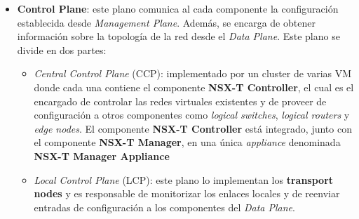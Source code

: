 \begin{itemize}
\begin{itemize}
        \item \textbf{Control Plane}: este plano comunica al cada componente la configuración establecida desde \textit{Management Plane}. Además, se encarga de obtener información sobre la topología de la red desde el \textit{Data Plane}. Este plano se divide en dos partes:
            \begin{itemize}
                \item \textit{Central Control Plane} (CCP): implementado por un cluster de varias VM donde cada una contiene el componente \textbf{NSX-T Controller}, el cual es el encargado de controlar las redes virtuales existentes y de proveer de configuración a otros componentes como \textit{logical switches}, \textit{logical routers} y \textit{edge nodes}. El componente \textbf{NSX-T Controller} está integrado, junto con el componente \textbf{NSX-T Manager}, en una única \textit{appliance} denominada \textbf{NSX-T Manager Appliance}
                \item \textit{Local Control Plane} (LCP): este plano lo implementan los \textbf{transport nodes} y es responsable de monitorizar los enlaces locales y de reenviar entradas de configuración a los componentes del \textit{Data Plane}.
            \end{itemize}

\end{itemize}
\end{itemize}
